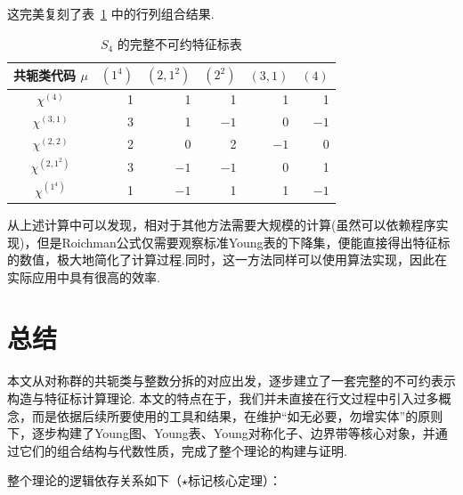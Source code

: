 \documentclass{sjtureport}
\renewcommand{\arraystretch}{1}
\begin{document}
这完美复刻了表~\ref{tab:s4-char} 中的行列组合结果.  

\begin{table}[H]
    \centering
    \renewcommand{\arraystretch}{1.25}
    \caption{$S_4$ 的完整不可约特征标表}
    \label{tab:s4-char}
    \begin{tabular}{c|rrrrr}
    共轭类代码 $\mu$ & $(1^4)$ & $(2,1^2)$ & $(2^2)$ & $(3,1)$ & $(4)$ \\
    \hline
    $\chi^{(4)}$ & 1 & 1 & 1 & 1 & 1 \\
    $\chi^{(3,1)}$ & 3 & 1 & $-1$ & 0 & $-1$ \\
    $\chi^{(2,2)}$ & 2 & 0 & 2 & $-1$ & 0 \\
    $\chi^{(2,1^2)}$ & 3 & $-1$ & $-1$ & 0 & 1 \\
    $\chi^{(1^4)}$ & 1 & $-1$ & 1 & 1 & $-1$ \\
    \end{tabular}
\end{table}
从上述计算中可以发现，相对于其他方法需要大规模的计算(虽然可以依赖程序实现)，但是Roichman公式仅需要观察标准Young表的下降集，便能直接得出特征标的数值，极大地简化了计算过程.同时，这一方法同样可以使用算法实现，因此在实际应用中具有很高的效率.

\chapter{总结}

本文从对称群的共轭类与整数分拆的对应出发，逐步建立了一套完整的不可约表示构造与特征标计算理论. 本文的特点在于，我们并未直接在行文过程中引入过多概念，而是依据后续所要使用的工具和结果，在维护“如无必要，勿增实体”的原则下，逐步构建了Young图、Young表、Young对称化子、边界带等核心对象，并通过它们的组合结构与代数性质，完成了整个理论的构建与证明.

整个理论的逻辑依存关系如下（$\star$标记核心定理）：
\end{document}
